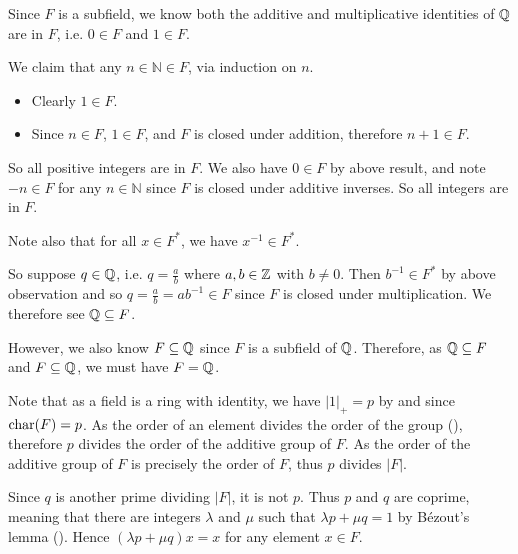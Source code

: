 \begin{questions}
    \item Since $F$ is a subfield, we know both the additive and multiplicative identities of $\mathbb{Q}$ are in $F$, i.e. $0 \in F$ and $1 \in F$.
    
    We claim that any $n \in \mathbb{N} \in F$, via induction on $n$.
    \begin{itemize}
        \item Clearly $1 \in F$.
        \item Since $n \in F$, $1 \in F$, and $F$ is closed under addition, therefore $n + 1 \in F$.
    \end{itemize}
    So all positive integers are in $F$. We also have $0 \in F$ by above result, and note $-n \in F$ for any $n \in \mathbb{N}$ since $F$ is closed under additive inverses. So all integers are in $F$.

    Note also that for all $x \in F^\ast$, we have $x^{-1} \in F^\ast$.

    So suppose $q \in \mathbb{Q}$, i.e. $q = \frac ab$ where $a, b \in \mathbb{Z}$ with $b \neq 0$. Then $b^{-1} \in F^\ast$ by above observation and so $q = \frac ab = ab^{-1} \in F$ since $F$ is closed under multiplication. We therefore see $\mathbb{Q} \subseteq F$.

    However, we also know $F \subseteq \mathbb{Q}$ since $F$ is a subfield of $\mathbb{Q}$. Therefore, as $\mathbb{Q} \subseteq F$ and $F \subseteq \mathbb{Q}$, we must have $F = \mathbb{Q}$.
    
    \item \begin{partquestions}{\roman*}
        \item Note that as a field is a ring with identity, we have $|1|_+ = p$ by  and since $\mathrm{char}(F) = p$. As the order of an element divides the order of the group (), therefore $p$ divides the order of the additive group of $F$. As the order of the additive group of $F$ is precisely the order of $F$, thus $p$ divides $|F|$.
        
        \item Since $q$ is another prime dividing $|F|$, it is not $p$. Thus $p$ and $q$ are coprime, meaning that there are integers $\lambda$ and $\mu$ such that $\lambda p + \mu q = 1$ by B\'ezout's lemma (). Hence $(\lambda p + \mu q)x = x$ for any element $x \in F$.
        

\end{partquestions}
\end{questions}

